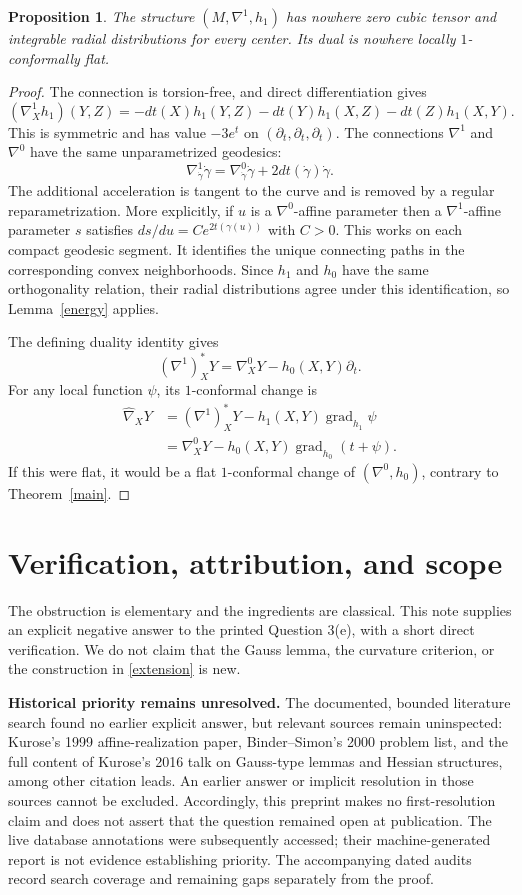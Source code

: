 \documentclass[11pt]{article}
\newtheorem{proposition}{Proposition}
\newcommand{\grad}{\operatorname{grad}}
\begin{document}
\begin{proposition}
The structure $(M,\nabla^1,h_1)$ has nowhere zero cubic tensor and
integrable radial distributions for every center. Its dual is nowhere
locally $1$-conformally flat.
\end{proposition}
\begin{proof}
The connection is torsion-free, and direct differentiation gives
\begin{equation}\label{cubic}
(\nabla^1_Xh_1)(Y,Z)=-dt(X)h_1(Y,Z)-dt(Y)h_1(X,Z)-dt(Z)h_1(X,Y).
\end{equation}
This is symmetric and has value $-3e^t$ on
$(\partial_t,\partial_t,\partial_t)$. The connections $\nabla^1$
and $\nabla^0$ have the same unparametrized geodesics:
\[
\nabla^1_{\dot\gamma}\dot\gamma
=\nabla^0_{\dot\gamma}\dot\gamma+2dt(\dot\gamma)\dot\gamma.
\]
The additional acceleration is tangent to the curve and is removed by
a regular reparametrization. More explicitly, if $u$ is a
$\nabla^0$-affine parameter then a $\nabla^1$-affine parameter $s$
satisfies $ds/du=C e^{2t(\gamma(u))}$ with $C>0$. This works on each
compact geodesic segment. It identifies the unique connecting paths in
the corresponding convex neighborhoods. Since $h_1$ and $h_0$ have the
same orthogonality relation, their radial distributions agree under
this identification, so Lemma~\ref{energy} applies.

The defining duality identity gives
\[
(\nabla^1)^*_XY=\nabla^0_XY-h_0(X,Y)\partial_t.
\]
For any local function $\psi$, its $1$-conformal change is
\begin{align*}
\widehat\nabla_XY
 &=(\nabla^1)^*_XY-h_1(X,Y)\grad_{h_1}\psi\\
 &=\nabla^0_XY-h_0(X,Y)\grad_{h_0}(t+\psi).
\end{align*}
If this were flat, it would be a flat $1$-conformal change of
$(\nabla^0,h_0)$, contrary to Theorem~\ref{main}.
\end{proof}

\section*{Verification, attribution, and scope}
The obstruction is elementary and the ingredients are classical.
This note supplies an explicit negative answer to the printed Question
3(e), with a short direct verification. We do not claim that the Gauss
lemma, the curvature criterion, or the construction in \eqref{extension}
is new.

\textbf{Historical priority remains unresolved.} The documented,
bounded literature search found no earlier explicit answer, but relevant
sources remain uninspected: Kurose's 1999 affine-realization paper,
Binder--Simon's 2000 problem list, and the full content of Kurose's 2016
talk on Gauss-type lemmas and Hessian structures, among other citation leads.
An earlier answer or implicit resolution in those sources cannot be
excluded. Accordingly, this preprint makes no first-resolution claim and
does not assert that the question remained open at publication. The live
database annotations were subsequently accessed; their machine-generated
report is not evidence establishing priority. The accompanying dated
audits record search coverage and remaining gaps separately from the proof.
\end{document}

